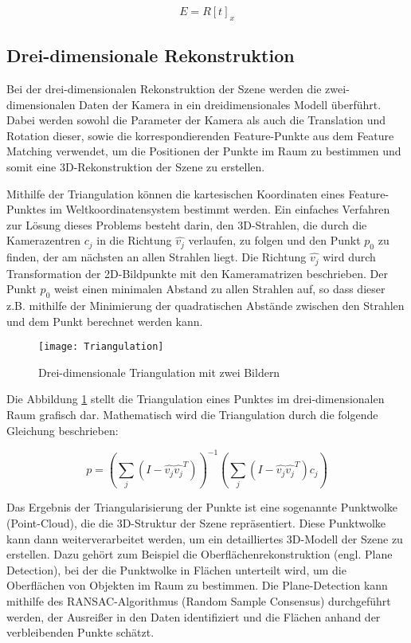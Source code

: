 \[E = R [t]_x\]

\subsection{Drei-dimensionale Rekonstruktion}

Bei der drei-dimensionalen Rekonstruktion der Szene werden die zwei-dimensionalen Daten der Kamera in ein dreidimensionales Modell überführt. Dabei werden sowohl die Parameter der Kamera als auch die Translation und Rotation dieser, sowie die korrespondierenden Feature-Punkte aus dem Feature Matching verwendet, um die Positionen der Punkte im Raum zu bestimmen und somit eine 3D-Rekonstruktion der Szene zu erstellen.

Mithilfe der Triangulation können die kartesischen Koordinaten eines Feature-Punktes im Weltkoordinatensystem bestimmt werden. Ein einfaches Verfahren zur Lösung dieses Problems besteht darin, den 3D-Strahlen, die durch die Kamerazentren \( c_j \) in die Richtung \( \hat{v_j} \) verlaufen, zu folgen und den Punkt \( p_0 \) zu finden, der am nächsten an allen Strahlen liegt. Die Richtung \( \hat{v_j} \) wird durch Transformation der 2D-Bildpunkte mit den Kameramatrizen beschrieben. Der Punkt \( p_0 \) weist einen minimalen Abstand zu allen Strahlen auf, so dass dieser z.B. mithilfe der Minimierung der quadratischen Abstände zwischen den Strahlen und dem Punkt berechnet werden kann.

\begin{figure}
    \centering
    \texttt{[image: Triangulation]}
    \caption{Drei-dimensionale Triangulation mit zwei Bildern\label{fig:Triangulation}}\par
\end{figure}

Die Abbildung \ref{fig:Triangulation} stellt die Triangulation eines Punktes im drei-dimensionalen Raum grafisch dar. Mathematisch wird die Triangulation durch die folgende Gleichung beschrieben:

\[
p = \left( \sum_j \left( I - \hat{v_j} \hat{v_j}^T \right) \right)^{-1} \left( \sum_j \left( I - \hat{v_j} \hat{v_j}^T \right) c_j \right)
\]

Das Ergebnis der Triangularisierung der Punkte ist eine sogenannte Punktwolke (Point-Cloud), die die 3D-Struktur der Szene repräsentiert. Diese Punktwolke kann dann weiterverarbeitet werden, um ein detailliertes 3D-Modell der Szene zu erstellen. Dazu gehört zum Beispiel die Oberflächenrekonstruktion (engl. Plane Detection), bei der die Punktwolke in Flächen unterteilt wird, um die Oberflächen von Objekten im Raum zu bestimmen. Die Plane-Detection kann mithilfe des RANSAC-Algorithmus (Random Sample Consensus) durchgeführt werden, der Ausreißer in den Daten identifiziert und die Flächen anhand der verbleibenden Punkte schätzt.

